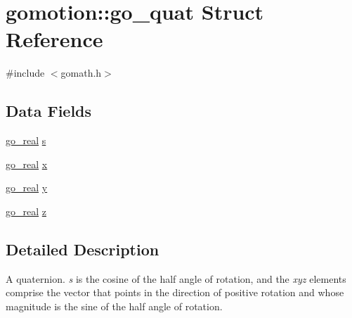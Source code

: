 \hypertarget{structgomotion_1_1go__quat}{\section{gomotion\-:\-:go\-\_\-quat Struct Reference}
\label{structgomotion_1_1go__quat}
}


{\ttfamily \#include $<$gomath.\-h$>$}

\subsection*{Data Fields}
\begin{DoxyCompactItemize}
\item 
\hyperlink{gotypes_8h_afd666a2393eebd71ee455846ac9def9b}{go\-\_\-real} \hyperlink{structgomotion_1_1go__quat_aad82d91646627a2c9ca3256d4bede64a}{s}
\item 
\hyperlink{gotypes_8h_afd666a2393eebd71ee455846ac9def9b}{go\-\_\-real} \hyperlink{structgomotion_1_1go__quat_a009660cf4962202e569fbe41b490722f}{x}
\item 
\hyperlink{gotypes_8h_afd666a2393eebd71ee455846ac9def9b}{go\-\_\-real} \hyperlink{structgomotion_1_1go__quat_a837f1ac99a7c09b80414f232e16ed1de}{y}
\item 
\hyperlink{gotypes_8h_afd666a2393eebd71ee455846ac9def9b}{go\-\_\-real} \hyperlink{structgomotion_1_1go__quat_a1ef5cc0b14458e74b4f47d4ccbc90f39}{z}
\end{DoxyCompactItemize}


\subsection{Detailed Description}
A quaternion. {\itshape s} is the cosine of the half angle of rotation, and the {\itshape xyz} elements comprise the vector that points in the direction of positive rotation and whose magnitude is the sine of the half angle of rotation. 

